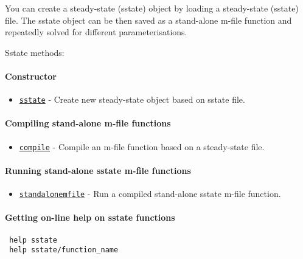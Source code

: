 

	You can create a steady-state (sstate) object by loading a steady-state
 (sstate) file. The sstate object can be then saved as a stand-alone
 m-file function and repeatedly solved for different parameterisations.
 
 Sstate methods:
 
 \paragraph{Constructor}
 
 \begin{itemize}
 \item
   \href{sstate/sstate}{\texttt{sstate}} - Create new steady-state object
   based on sstate file.
 \end{itemize}
 
 \paragraph{Compiling stand-alone m-file functions}
 
 \begin{itemize}
 \item
   \href{sstate/compile}{\texttt{compile}} - Compile an m-file function
   based on a steady-state file.
 \end{itemize}
 
 \paragraph{Running stand-alone sstate m-file functions}
 
 \begin{itemize}
 \item
   \href{sstate/standalonemfile}{\texttt{standalonemfile}} - Run a
   compiled stand-alone sstate m-file function.
 \end{itemize}
 
 \paragraph{Getting on-line help on sstate functions}
 
 \begin{verbatim}
 help sstate
 help sstate/function_name
 \end{verbatim}



